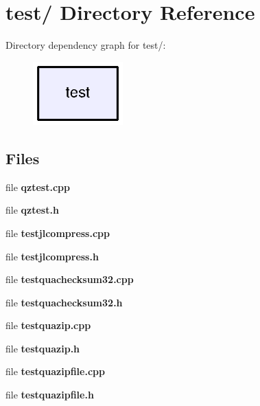 \section{test/ Directory Reference}
\label{dir_55cb3be4cb2a0399f4f34e2a198a7250}
Directory dependency graph for test/:
\nopagebreak
\begin{figure}[H]
\begin{center}
\leavevmode
\includegraphics[width=98pt]{dir_55cb3be4cb2a0399f4f34e2a198a7250_dep}
\end{center}
\end{figure}
\subsection*{Files}
\begin{DoxyCompactItemize}
\item 
file {\bfseries qztest.cpp}
\item 
file {\bfseries qztest.h}
\item 
file {\bfseries testjlcompress.cpp}
\item 
file {\bfseries testjlcompress.h}
\item 
file {\bfseries testquachecksum32.cpp}
\item 
file {\bfseries testquachecksum32.h}
\item 
file {\bfseries testquazip.cpp}
\item 
file {\bfseries testquazip.h}
\item 
file {\bfseries testquazipfile.cpp}
\item 
file {\bfseries testquazipfile.h}
\end{DoxyCompactItemize}
